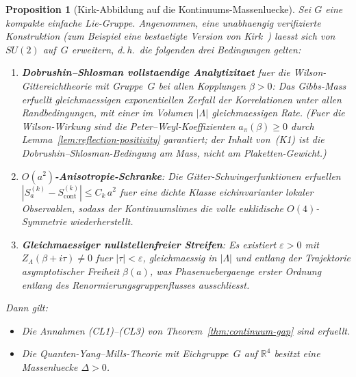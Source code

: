 \documentclass[12pt,a4paper]{article}
\theoremstyle{definition}
\theoremstyle{plain}
\newtheorem{proposition}[definition]{Proposition}
\theoremstyle{remark}
\begin{document}
\begin{proposition}[Kirk-Abbildung auf die Kontinuums-Massenluecke]
\label{prop:kirk-mapping}
Sei $G$ eine kompakte einfache Lie-Gruppe. Angenommen, eine unabhaengig
verifizierte Konstruktion (zum Beispiel eine bestaetigte Version von
Kirk~\cite{Kirk2026}) laesst sich von $SU(2)$ auf~$G$ erweitern,
d.\,h.\ die folgenden drei Bedingungen gelten:
\begin{enumerate}[label=\textup{(K\arabic*)}]
    \item \textbf{Dobrushin--Shlosman vollstaendige Analytizitaet} fuer die
        Wilson-Gittereichtheorie mit Gruppe~$G$ bei allen Kopplungen $\beta > 0$:
        Das Gibbs-Mass erfuellt gleichmaessigen exponentiellen Zerfall der
        Korrelationen unter allen Randbedingungen, mit einer im Volumen $|\Lambda|$
        gleichmaessigen Rate. (Fuer die Wilson-Wirkung sind die Peter--Weyl-Koeffizienten
        $a_\pi(\beta) \geq 0$ durch Lemma~\ref{lem:reflection-positivity} garantiert;
        der Inhalt von~\textup{(K1)} ist die Dobrushin--Shlosman-Bedingung am
        \emph{Mass}, nicht am Plaketten-Gewicht.)
    \item \textbf{$O(a^2)$-Anisotropie-Schranke}: Die Gitter-Schwingerfunktionen
        erfuellen $|S^{(k)}_a - S^{(k)}_{\mathrm{cont}}| \leq C_k\,a^2$ fuer
        eine dichte Klasse eichinvarianter lokaler Observablen, sodass
        der Kontinuumslimes die volle euklidische $O(4)$-Symmetrie wiederherstellt.
    \item \textbf{Gleichmaessiger nullstellenfreier Streifen}: Es existiert $\varepsilon > 0$
        mit $Z_\Lambda(\beta + i\tau) \neq 0$ fuer $|\tau| < \varepsilon$,
        gleichmaessig in $|\Lambda|$ und entlang der Trajektorie asymptotischer
        Freiheit $\beta(a)$, was Phasenuebergaenge erster Ordnung entlang des
        Renormierungsgruppenflusses ausschliesst.
\end{enumerate}
Dann gilt:
\begin{itemize}
    \item[\textup{(a)}] Die Annahmen \textup{(CL1)--(CL3)} von
        Theorem~\ref{thm:continuum-gap} sind erfuellt.
    \item[\textup{(b)}] Die Quanten-Yang--Mills-Theorie mit Eichgruppe~$G$
        auf $\mathbb{R}^4$ besitzt eine Massenluecke $\Delta > 0$.
\end{itemize}
\end{proposition}
\end{document}
